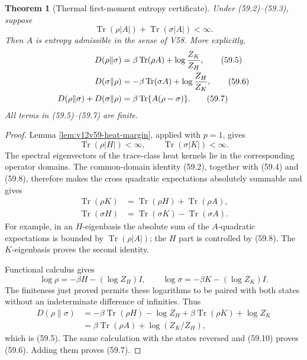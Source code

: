 \documentclass[11pt]{article}
\newtheorem{theorem}{Theorem}[section]
\theoremstyle{remark}
\begin{document}
\begin{theorem}[Thermal first-moment entropy certificate]
\label{thm:v12v59-certificate}
Under (59.2)--(59.3), suppose
\begin{equation}
 \operatorname{Tr}(\rho|A|)
 +
 \operatorname{Tr}(\sigma|A|)<\infty.             \tag{59.4}
\end{equation}
Then \(A\) is entropy admissible in the sense of V58.  More
explicitly,
\begin{align}
 D(\rho\|\sigma)
 &=
 \beta\operatorname{Tr}(\rho A)
 +\log{Z_K\over Z_H},                             \tag{59.5}\\
 D(\sigma\|\rho)
 &=
 -\beta\operatorname{Tr}(\sigma A)
 +\log{Z_H\over Z_K},                             \tag{59.6}\\
 D(\rho\|\sigma)+D(\sigma\|\rho)
 &=
 \beta\operatorname{Tr}\{A(\rho-\sigma)\}.        \tag{59.7}
\end{align}
All terms in (59.5)--(59.7) are finite.
\end{theorem}

\begin{proof}
Lemma \ref{lem:v12v59-heat-margin}, applied with \(p=1\), gives
\begin{equation}
 \operatorname{Tr}(\rho|H|)<\infty,
 \qquad
 \operatorname{Tr}(\sigma|K|)<\infty.             \tag{59.8}
\end{equation}
The spectral eigenvectors of the trace-class heat kernels lie in the
corresponding operator domains.  The common-domain identity (59.2),
together with (59.4) and (59.8), therefore makes the cross quadratic
expectations absolutely summable and gives
\begin{align}
 \operatorname{Tr}(\rho K)
 &=
 \operatorname{Tr}(\rho H)+\operatorname{Tr}(\rho A),
                                                        \tag{59.9}\\
 \operatorname{Tr}(\sigma H)
 &=
 \operatorname{Tr}(\sigma K)-\operatorname{Tr}(\sigma A).
                                                        \tag{59.10}
\end{align}
For example, in an \(H\)-eigenbasis the absolute sum of the
\(A\)-quadratic expectations is bounded by
\(\operatorname{Tr}(\rho|A|)\); the \(H\) part is controlled by
(59.8).  The \(K\)-eigenbasis proves the second identity.

Functional calculus gives
\[
 \log\rho=-\beta H-(\log Z_H)I,\qquad
 \log\sigma=-\beta K-(\log Z_K)I.
\]
The finiteness just proved permits these logarithms to be paired with
both states without an indeterminate difference of infinities.
Thus
\begin{align*}
 D(\rho\|\sigma)
 &=
 -\beta\operatorname{Tr}(\rho H)-\log Z_H
 +\beta\operatorname{Tr}(\rho K)+\log Z_K\\
 &=
 \beta\operatorname{Tr}(\rho A)+\log(Z_K/Z_H),
\end{align*}
which is (59.5).  The same calculation with the states reversed and
(59.10) proves (59.6).  Adding them proves (59.7).
\end{proof}
\end{document}
